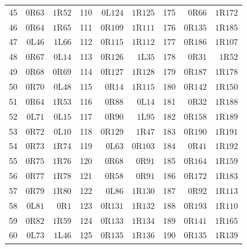 {\begin{longtable}{@{}rrrrrrrrr@{}}
45 & $0\mathrm{R}63$ & $1\mathrm{R}52$ & 110 & $0\mathrm{L}124$ & $1\mathrm{R}125$ & 175 & $0\mathrm{R}66$ & $1\mathrm{R}172$\\
46 & $0\mathrm{R}64$ & $1\mathrm{R}65$ & 111 & $0\mathrm{R}109$ & $1\mathrm{R}111$ & 176 & $0\mathrm{R}135$ & $1\mathrm{R}185$\\
47 & $0\mathrm{L}46$ & $1\mathrm{L}66$ & 112 & $0\mathrm{R}115$ & $1\mathrm{R}112$ & 177 & $0\mathrm{R}186$ & $1\mathrm{R}107$\\
48 & $0\mathrm{R}67$ & $0\mathrm{L}14$ & 113 & $0\mathrm{R}126$ & $1\mathrm{L}35$ & 178 & $0\mathrm{R}31$ & $1\mathrm{R}52$\\
49 & $0\mathrm{R}68$ & $0\mathrm{R}69$ & 114 & $0\mathrm{R}127$ & $1\mathrm{R}128$ & 179 & $0\mathrm{R}187$ & $1\mathrm{R}178$\\
50 & $0\mathrm{R}70$ & $0\mathrm{L}48$ & 115 & $0\mathrm{R}14$ & $1\mathrm{R}115$ & 180 & $0\mathrm{R}142$ & $1\mathrm{R}150$\\
51 & $0\mathrm{R}64$ & $1\mathrm{R}53$ & 116 & $0\mathrm{R}88$ & $0\mathrm{L}14$ & 181 & $0\mathrm{R}32$ & $1\mathrm{R}188$\\
52 & $0\mathrm{L}71$ & $0\mathrm{L}15$ & 117 & $0\mathrm{R}90$ & $1\mathrm{L}95$ & 182 & $0\mathrm{R}158$ & $1\mathrm{R}189$\\
53 & $0\mathrm{R}72$ & $0\mathrm{L}10$ & 118 & $0\mathrm{R}129$ & $1\mathrm{R}47$ & 183 & $0\mathrm{R}190$ & $1\mathrm{R}191$\\
54 & $0\mathrm{R}73$ & $1\mathrm{R}74$ & 119 & $0\mathrm{L}63$ & $0\mathrm{R}103$ & 184 & $0\mathrm{R}41$ & $1\mathrm{R}192$\\
55 & $0\mathrm{R}75$ & $1\mathrm{R}76$ & 120 & $0\mathrm{R}68$ & $0\mathrm{R}91$ & 185 & $0\mathrm{R}164$ & $1\mathrm{R}159$\\
56 & $0\mathrm{R}77$ & $1\mathrm{R}78$ & 121 & $0\mathrm{R}58$ & $0\mathrm{R}91$ & 186 & $0\mathrm{R}172$ & $1\mathrm{R}183$\\
57 & $0\mathrm{R}79$ & $1\mathrm{R}80$ & 122 & $0\mathrm{L}86$ & $1\mathrm{R}130$ & 187 & $0\mathrm{R}92$ & $1\mathrm{R}113$\\
58 & $0\mathrm{L}81$ & $0\mathrm{R}1$ & 123 & $0\mathrm{R}131$ & $1\mathrm{R}132$ & 188 & $0\mathrm{R}193$ & $1\mathrm{R}110$\\
59 & $0\mathrm{R}82$ & $1\mathrm{R}59$ & 124 & $0\mathrm{R}133$ & $1\mathrm{R}134$ & 189 & $0\mathrm{R}141$ & $1\mathrm{R}165$\\
60 & $0\mathrm{L}73$ & $1\mathrm{L}46$ & 125 & $0\mathrm{R}135$ & $1\mathrm{R}136$ & 190 & $0\mathrm{R}135$ & $1\mathrm{R}139$\\

\end{longtable}}
